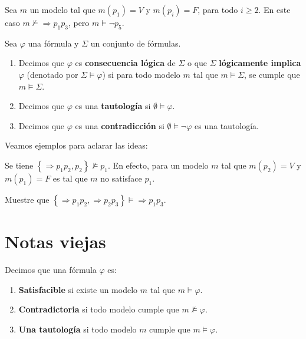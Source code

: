 \documentclass[12pt]{report}
\theoremstyle{largebreak}
\begin{document}
    \begin{exa}
        Sea $m$ un modelo tal que $m(p_1)=V$ y $m(p_i)=F$, para todo $i\geq2$. En este caso $m\nvDash \Rightarrow p_1p_3$, pero $m\vDash \neg p_5$.
    \end{exa}

    \begin{mydef}
        Sea $\varphi$ una fórmula y $\Sigma$ un conjunto de fórmulas.
        \begin{enumerate}
            \item Decimos que $\varphi$ es \textbf{consecuencia lógica} de $\Sigma$ o que $\Sigma$ \textbf{lógicamente implica} $\varphi$ (denotado por $\Sigma\vDash\varphi$) si para todo modelo $m$ tal que $m\vDash\Sigma$, se cumple que $m\vDash\Sigma$.
            \item Decimos que $\varphi$ es una \textbf{tautología} si $\emptyset\vDash\varphi$.
            \item Decimos que $\varphi$ es una \textbf{contradicción} si $\emptyset\vDash\neg\varphi$ es una tautología.
        \end{enumerate}
    \end{mydef}

    Veamos ejemplos para aclarar las ideas:

    \begin{exa}
        Se tiene $\left\{\Rightarrow p_1p_2,p_2 \right\}\nvDash p_1$. En efecto, para un modelo $m$ tal que $m(p_2)=V$ y $m(p_1)=F$ es tal que $m$ no satisface $p_1$.
    \end{exa}

    \begin{exa}
        Muestre que $\left\{\Rightarrow p_1p_2,\Rightarrow p_2p_3 \right\}\vDash\Rightarrow p_1p_3$.
    \end{exa}

    \section*{Notas viejas}
    
    \begin{mydef}
        Decimos que una fórmula $\varphi$ es:
        \begin{enumerate}
            \item \textbf{Satisfacible} si existe un modelo $m$ tal que $m\vDash\varphi$.
            \item \textbf{Contradictoria} si todo modelo cumple que $m\nvDash\varphi$.
            \item \textbf{Una tautología} si todo modelo $m$ cumple que $m\vDash\varphi$.
        \end{enumerate}
    \end{mydef}
\end{document}

